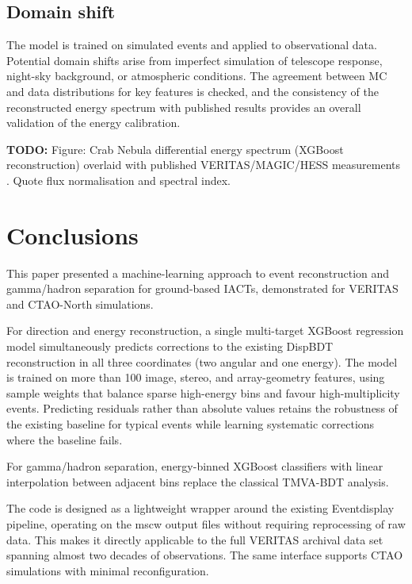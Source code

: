 \documentclass[12pt]{article}
\newcommand{\todo}[1]{\begin{hintBox} \textbf{TODO:} #1 \end{hintBox}}
\begin{document}
\subsection{Domain shift}

The model is trained on simulated events and applied to observational data.
Potential domain shifts arise from imperfect simulation of telescope response,
night-sky background, or atmospheric conditions.
The agreement between MC and data distributions for key features is checked,
and the consistency of the reconstructed energy spectrum with published results
provides an overall validation of the energy calibration.
\todo{Figure: Crab Nebula differential energy spectrum (XGBoost reconstruction) overlaid with published VERITAS/MAGIC/HESS measurements \citep{2015ICRC...34..792A}. Quote flux normalisation and spectral index.}



\section{Conclusions}
\label{sec:conclusions}

This paper presented a machine-learning approach to event reconstruction and
gamma/hadron separation for ground-based IACTs, demonstrated for VERITAS and
CTAO-North simulations.

For direction and energy reconstruction, a single multi-target XGBoost regression model
simultaneously predicts corrections to the existing DispBDT reconstruction
in all three coordinates (two angular and one energy).
The model is trained on more than 100 image, stereo, and array-geometry features,
using sample weights that balance sparse high-energy bins and favour high-multiplicity events.
Predicting residuals rather than absolute values retains the robustness of the
existing baseline for typical events while learning systematic corrections where the
baseline fails.

For gamma/hadron separation, energy-binned XGBoost classifiers with linear
interpolation between adjacent bins replace the classical TMVA-BDT analysis.

The code is designed as a lightweight wrapper around the existing Eventdisplay
pipeline, operating on the mscw output files without requiring reprocessing
of raw data.
This makes it directly applicable to the full VERITAS archival data set
spanning almost two decades of observations.
The same interface supports CTAO simulations with minimal reconfiguration.
\end{document}
